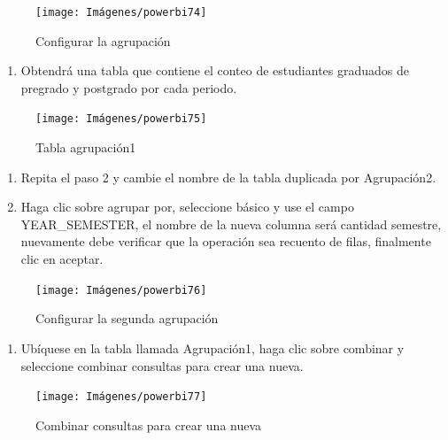 \documentclass[
]{book}
\providecommand{\tightlist}{%
  \setlength{\itemsep}{0pt}\setlength{\parskip}{0pt}}
\begin{document}
\begin{figure}

{\centering \texttt{[image: Imágenes/powerbi74]} 

}

\caption{Configurar la agrupación}\label{fig:paso4porcentajes-fig}
\end{figure}

\begin{enumerate}
\def\labelenumi{\arabic{enumi}.}
\setcounter{enumi}{4}
\tightlist
\item
  Obtendrá una tabla que contiene el conteo de estudiantes graduados de pregrado y postgrado por cada periodo.
\end{enumerate}

\begin{figure}

{\centering \texttt{[image: Imágenes/powerbi75]} 

}

\caption{Tabla agrupación1}\label{fig:paso5porcentajes-fig}
\end{figure}

\begin{enumerate}
\def\labelenumi{\arabic{enumi}.}
\setcounter{enumi}{5}
\item
  Repita el paso 2 y cambie el nombre de la tabla duplicada por Agrupación2.
\item
  Haga clic sobre agrupar por, seleccione básico y use el campo YEAR\_SEMESTER, el nombre de la nueva columna será cantidad semestre, nuevamente debe verificar que la operación sea recuento de filas, finalmente clic en aceptar.
\end{enumerate}

\begin{figure}

{\centering \texttt{[image: Imágenes/powerbi76]} 

}

\caption{Configurar la segunda agrupación}\label{fig:paso7porcentajes-fig}
\end{figure}

\begin{enumerate}
\def\labelenumi{\arabic{enumi}.}
\setcounter{enumi}{7}
\tightlist
\item
  Ubíquese en la tabla llamada Agrupación1, haga clic sobre combinar y seleccione combinar consultas para crear una nueva.
\end{enumerate}

\begin{figure}

{\centering \texttt{[image: Imágenes/powerbi77]} 

}

\caption{Combinar consultas para crear una nueva}\label{fig:paso8porcentajes-fig}
\end{figure}
\end{document}
